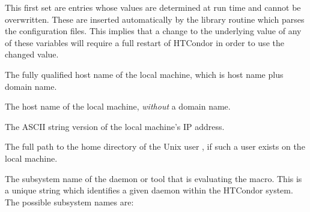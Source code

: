 This first set are entries whose values are determined at
run time and cannot be overwritten.  These are inserted automatically by
the library routine which parses the configuration files.
This implies that a change to the underlying value of any of these
variables will require a full restart of HTCondor in order to use
the changed value.
\begin{description}
  
\label{param:FullHostname}
\item[\MacroU{FULL\_HOSTNAME}]
  The fully qualified host name of the local machine, 
  which is host name plus domain name.
  
\label{param:Hostname}
\item[\MacroU{HOSTNAME}]
  The host name of the local machine, \emph{without} a domain name.
  
\label{param:IpAddress}
\item[\MacroU{IP\_ADDRESS}]
  The ASCII string version of the local machine's IP address.

\label{param:Tilde}
\item[\MacroU{TILDE}]
  The full path to the
  home directory of the Unix user , if such a user exists on the
  local machine.

  \label{sec:HTCondor-Subsystem-Names}
\label{param:Subsystem}
\item[\MacroU{SUBSYSTEM}]
  The subsystem
  name of the daemon or tool that is evaluating the macro.
  This is a unique string which identifies a given daemon within the
  HTCondor system.  The possible subsystem names are:


\end{description}
